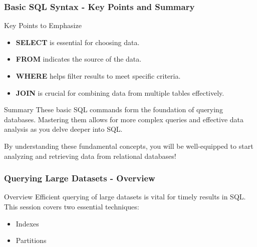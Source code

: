 \documentclass{beamer}
\begin{document}
\begin{frame}[fragile]
    \frametitle{Basic SQL Syntax - Key Points and Summary}
    \begin{block}{Key Points to Emphasize}
        \begin{itemize}
            \item \textbf{SELECT} is essential for choosing data.
            \item \textbf{FROM} indicates the source of the data.
            \item \textbf{WHERE} helps filter results to meet specific criteria.
            \item \textbf{JOIN} is crucial for combining data from multiple tables effectively.
        \end{itemize}
    \end{block}
    
    \begin{block}{Summary}
        These basic SQL commands form the foundation of querying databases. Mastering them allows for more complex queries and effective data analysis as you delve deeper into SQL.
        
        By understanding these fundamental concepts, you will be well-equipped to start analyzing and retrieving data from relational databases!
    \end{block}
\end{frame}

\begin{frame}
    \frametitle{Querying Large Datasets - Overview}
    \begin{block}{Overview}
        Efficient querying of large datasets is vital for timely results in SQL. 
        This session covers two essential techniques:
        \begin{itemize}
            \item Indexes
            \item Partitions
        \end{itemize}
    \end{block}
\end{frame}
\end{document}
